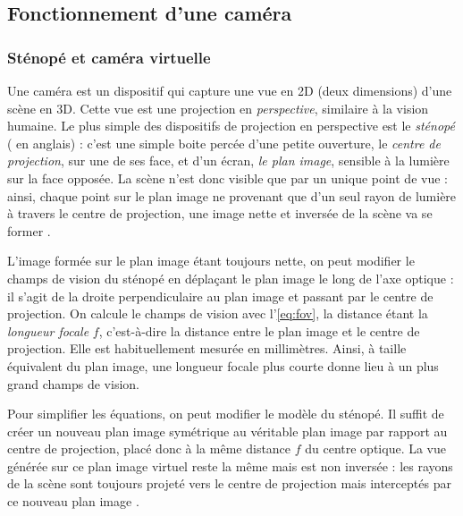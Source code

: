 \subsection{Fonctionnement d'une caméra}
\subsubsection{Sténopé et caméra virtuelle}
Une caméra est un dispositif qui capture une vue en 2D (deux dimensions) d'une scène en 3D. Cette vue est une projection en \emph{perspective}, similaire à la vision humaine. Le plus simple des dispositifs de projection en perspective est le \emph{sténopé} ( en anglais) : c'est une simple boite percée d'une petite ouverture, le \emph{centre de projection}, sur une de ses face, et d'un écran, \emph{le plan image}, sensible à la lumière sur la face opposée. La scène n'est donc visible que par un unique point de vue : ainsi, chaque point sur le plan image ne provenant que d'un seul rayon de lumière à travers le centre de projection, une image nette et inversée de la scène va se former .


L'image formée sur le plan image étant toujours nette, on peut modifier le champs de vision du sténopé en déplaçant le plan image le long de l'axe optique : il s'agit de la droite perpendiculaire au plan image et passant par le centre de projection. On calcule le champs de vision avec l'\autoref{eq:fov}, la distance étant la \emph{longueur focale} $f$, c'est-à-dire la distance entre le plan image et le centre de projection. Elle est habituellement mesurée en millimètres. Ainsi, à taille équivalent du plan image, une longueur focale plus courte donne lieu à un plus grand champs de vision.

Pour simplifier les équations, on peut modifier le modèle du sténopé. Il suffit de créer un nouveau plan image symétrique au véritable plan image par rapport au centre de projection, placé donc à la même distance $f$ du centre optique. La vue générée sur ce plan image virtuel reste la même mais est non inversée : les rayons de la scène sont toujours projeté vers le centre de projection mais interceptés par ce nouveau plan image .

